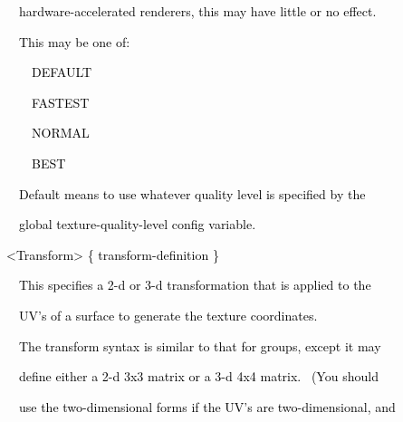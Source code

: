 \documentclass[a4paper]{article}
\newcommand\textstyleOOoComputerKeyWord[1]{\textrm{\textcolor[rgb]{0.0,0.0,0.5019608}{#1}}}
\begin{document}
{\color{black}
\textstyleOOoComputerKeyWord{\textcolor{black}{\ \ \ \ hardware-accelerated renderers, this may have little or no
effect.}}}

\clearpage
\bigskip


\bigskip

{\color{black}
\textstyleOOoComputerKeyWord{\textcolor{black}{\ \ \ \ This may be one of:}}}


\bigskip

{\color{black}
\textstyleOOoComputerKeyWord{\textcolor{black}{\ \ \ \ \ \ DEFAULT}}}

{\color{black}
\textstyleOOoComputerKeyWord{\textcolor{black}{\ \ \ \ \ \ FASTEST}}}

{\color{black}
\textstyleOOoComputerKeyWord{\textcolor{black}{\ \ \ \ \ \ NORMAL}}}

{\color{black}
\textstyleOOoComputerKeyWord{\textcolor{black}{\ \ \ \ \ \ BEST}}}


\bigskip

{\color{black}
\textstyleOOoComputerKeyWord{\textcolor{black}{\ \ \ \ {\textquotedbl}Default{\textquotedbl} means to use whatever
quality level is specified by the}}}

{\color{black}
\textstyleOOoComputerKeyWord{\textcolor{black}{\ \ \ \ global texture-quality-level config variable.}}}


\bigskip

{\color{black}
\textstyleOOoComputerKeyWord{\textcolor{black}{\ \ {\textless}Transform{\textgreater} \{ transform-definition \}}}}


\bigskip

{\color{black}
\textstyleOOoComputerKeyWord{\textcolor{black}{\ \ \ \ This specifies a 2-d or 3-d transformation that is applied to
the}}}

{\color{black}
\textstyleOOoComputerKeyWord{\textcolor{black}{\ \ \ \ UV's of a surface to generate the texture coordinates.}}}


\bigskip

{\color{black}
\textstyleOOoComputerKeyWord{\textcolor{black}{\ \ \ \ The transform syntax is similar to that for groups, except it
may}}}

{\color{black}
\textstyleOOoComputerKeyWord{\textcolor{black}{\ \ \ \ define either a 2-d 3x3 matrix or a 3-d 4x4 matrix. \ (You
should}}}

{\color{black}
\textstyleOOoComputerKeyWord{\textcolor{black}{\ \ \ \ use the two-dimensional forms if the UV's are two-dimensional,
and}}}
\end{document}

